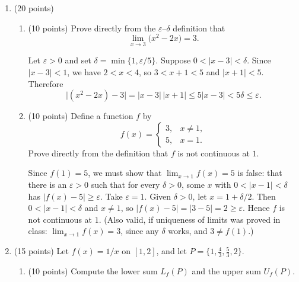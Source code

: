 \documentclass[12pt,letterpaper]{article}
\newcommand{\points}[1]{(#1 points)}
\begin{document}
\begin{enumerate}[label=\textbf{\arabic*.},leftmargin=2em]
  \item \points{20}
    \begin{enumerate}[label=(\alph*)]
      \item \points{10} Prove directly from the $\varepsilon$--$\delta$
        definition that
        \[
          \lim_{x\to 3}\bigl(x^2-2x\bigr)=3.
        \]

        \begin{solution}
          Let $\varepsilon>0$ and set $\delta=\min\{1,\varepsilon/5\}$.
          Suppose $0<|x-3|<\delta$. Since $|x-3|<1$, we have $2<x<4$, so
          $3<x+1<5$ and $|x+1|<5$. Therefore
          \[
            \bigl|(x^2-2x)-3\bigr|=|x-3|\,|x+1|\le 5|x-3|<5\delta\le\varepsilon.
          \]
        \end{solution}
        \vfill

      \item \points{10} Define a function $f$ by
        \[
          f(x)=
          \begin{cases}
            3, & x\neq 1,\\
            5, & x=1.
          \end{cases}
        \]
        Prove directly from the definition that $f$ is not continuous at $1$.

        \begin{solution}
          Since $f(1)=5$, we must show that $\lim_{x\to 1}f(x)=5$ is false:
          that there is an $\varepsilon>0$ such that for every $\delta>0$,
          some $x$ with $0<|x-1|<\delta$ has $|f(x)-5|\ge\varepsilon$. Take
          $\varepsilon=1$. Given $\delta>0$, let $x=1+\delta/2$. Then
          $0<|x-1|<\delta$ and $x\neq 1$, so
          $|f(x)-5|=|3-5|=2\ge\varepsilon$. Hence $f$ is not continuous
          at $1$. (Also valid, if uniqueness of limits was proved in class:
          $\lim_{x\to 1}f(x)=3$, since any $\delta$ works, and $3\neq f(1)$.)
        \end{solution}
        \vfill
    \end{enumerate}
    \newpage

  \item \points{15}
    Let $f(x)=1/x$ on $[1,2]$, and let $P=\{1,\tfrac43,\tfrac53,2\}$.
    \begin{enumerate}[label=(\alph*)]
      \item \points{10} Compute the lower sum $L_f(P)$ and the upper sum
        $U_f(P)$.


\end{enumerate}
\end{enumerate}
\end{document}
